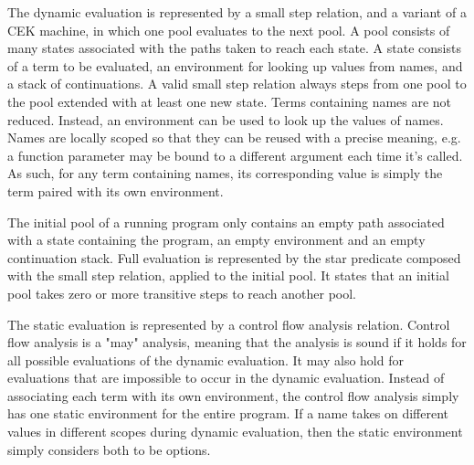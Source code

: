 \documentclass[letterpaper, 11pt]{report}
\begin{document}
The dynamic evaluation is represented by a small step relation, and a variant of a CEK machine, in which one pool evaluates
to the next pool. A pool consists of many states associated with the paths taken to reach each state. A state consists
of a term to be evaluated, an environment for looking up values from names, and a stack of continuations.
A valid small step relation always steps from one pool to the pool extended with at least one new state.
Terms containing names are not reduced. Instead, an environment can be used to look up the values of names.
Names are locally scoped so that they can be reused with a precise meaning, e.g. a function parameter may be bound to
a different argument each time it's called. As such, for any term containing names, its corresponding value is simply
the term paired with its own environment.

The initial pool of a running program only contains an empty path associated with a state containing the program,
an empty environment and an empty continuation stack.
Full evaluation is represented by the star predicate composed with the small step relation, applied to the initial pool.
It states that an initial pool takes zero or more transitive steps to reach another pool.

The static evaluation is represented by a control flow analysis relation. Control flow analysis is a "may" analysis,
meaning that the analysis is sound if it holds for all possible evaluations of the dynamic evaluation.
It may also hold for evaluations that are impossible to occur in the dynamic evaluation.
Instead of associating each term with its own environment, the control flow analysis simply has one static environment
for the entire program. If a name takes on different values in different scopes during dynamic evaluation, then
the static environment simply considers both to be options. 
\end{document}
